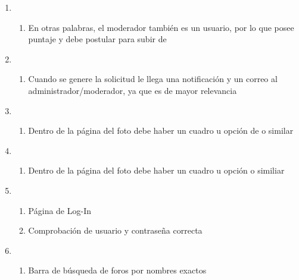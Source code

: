 \documentclass[12pt, letterpaper, notitlepage]{article}
\begin{document}
\begin{enumerate}
        \item {}
        \begin{enumerate}
            \item En otras palabras, el moderador también es un usuario, por lo que posee puntaje y debe postular para subir de 
        \end{enumerate}

        \item {}
        \begin{enumerate}
            \item Cuando se genere la solicitud le llega una notificación y un correo al administrador/moderador, ya que es de mayor relevancia
        \end{enumerate}

        \item {}
        \begin{enumerate}
            \item Dentro de la página del foto debe haber un cuadro u opción de  o similar
        \end{enumerate}

        \item {}
        \begin{enumerate}
            \item Dentro de la página del foto debe haber un cuadro u opción  o similiar
        \end{enumerate}

        \item {}
        \begin{enumerate}
            \item Página de Log-In
            \item Comprobación de usuario y contraseña correcta
        \end{enumerate}

        \item {}
        \begin{enumerate}
            \item Barra de búsqueda de foros por nombres exactos
        \end{enumerate}


\end{enumerate}
\end{document}
